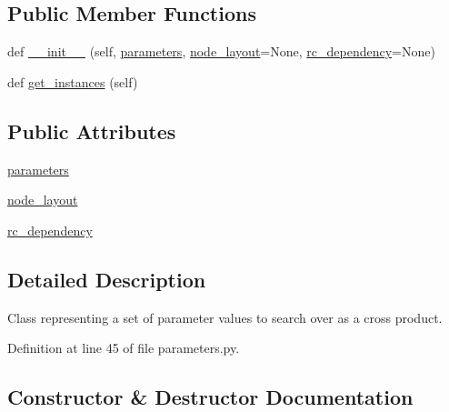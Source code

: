 \subsection*{Public Member Functions}
\begin{DoxyCompactItemize}
\item 
def \hyperlink{classcodar_1_1cheetah_1_1parameters_1_1_sweep_a3ea717e50ebd6bf25d6c0548060d9b44}{\+\_\+\+\_\+init\+\_\+\+\_\+} (self, \hyperlink{classcodar_1_1cheetah_1_1parameters_1_1_sweep_a5150062c13d48ec754188e4806958879}{parameters}, \hyperlink{classcodar_1_1cheetah_1_1parameters_1_1_sweep_a2f9c8f2db28d801a5148904e85af06c6}{node\+\_\+layout}=None, \hyperlink{classcodar_1_1cheetah_1_1parameters_1_1_sweep_acaa6e4b27adef89d6383a075d31e761c}{rc\+\_\+dependency}=None)
\item 
def \hyperlink{classcodar_1_1cheetah_1_1parameters_1_1_sweep_a25c111a2541f852d385d84baf51e9687}{get\+\_\+instances} (self)
\end{DoxyCompactItemize}
\subsection*{Public Attributes}
\begin{DoxyCompactItemize}
\item 
\hyperlink{classcodar_1_1cheetah_1_1parameters_1_1_sweep_a5150062c13d48ec754188e4806958879}{parameters}
\item 
\hyperlink{classcodar_1_1cheetah_1_1parameters_1_1_sweep_a2f9c8f2db28d801a5148904e85af06c6}{node\+\_\+layout}
\item 
\hyperlink{classcodar_1_1cheetah_1_1parameters_1_1_sweep_acaa6e4b27adef89d6383a075d31e761c}{rc\+\_\+dependency}
\end{DoxyCompactItemize}


\subsection{Detailed Description}
\begin{DoxyVerb}Class representing a set of parameter values to search over as
a cross product.
\end{DoxyVerb}
 

Definition at line 45 of file parameters.\+py.



\subsection{Constructor \& Destructor Documentation}
\mbox{\label{classcodar_1_1cheetah_1_1parameters_1_1_sweep_a3ea717e50ebd6bf25d6c0548060d9b44}} 

